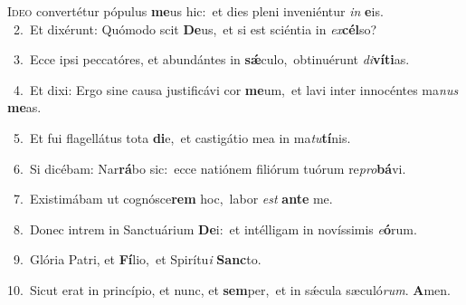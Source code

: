 \lettrine{\initial\textcolor{\initialcolor}{I}}{deo} convertétur pópulus \textbf{me}\-us hic:~\star et dies pleni inveniéntur \textit{in} \textbf{e}\-is.\\
{\numbfont\textcolor{\numbcolor}{~2.}}~Et dixérunt: Quómodo scit \textbf{De}\-us,~\star et si est sciéntia in \textit{ex}\-\textbf{cél}so?\par
{\numbfont\textcolor{\numbcolor}{~3.}}~Ecce ipsi peccatóres, et abundántes in \textbf{sǽ}\-culo,~\star obtinuérunt \textit{di}\-\textbf{ví}\textbf{ti}as.\par
{\numbfont\textcolor{\numbcolor}{~4.}}~Et dixi: Ergo sine causa justificávi cor \textbf{me}\-um,~\star et lavi inter innocéntes ma\textit{nus} \textbf{me}\-as.\par
{\numbfont\textcolor{\numbcolor}{~5.}}~Et fui flagellátus tota \textbf{di}\-e,~\star et castigátio mea in ma\-\textit{tu}\-\textbf{tí}nis.\par
{\numbfont\textcolor{\numbcolor}{~6.}}~Si dicébam: Nar\-\textbf{rá}\-bo sic:~\star ecce natiónem filiórum tuórum re\-\textit{pro}\-\textbf{bá}vi.\par
{\numbfont\textcolor{\numbcolor}{~7.}}~Existimábam ut cognósce\textbf{rem} hoc,~\star labor \textit{est} \textbf{an}\-\textbf{te} me.\par
{\numbfont\textcolor{\numbcolor}{~8.}}~Donec intrem in Sanctuárium \textbf{De}\-i:~\star et intélligam in novíssimis \textit{e}\-\textbf{ó}rum.\par
{\numbfont\textcolor{\numbcolor}{~9.}}~Glória Patri, et \textbf{Fí}\-lio,~\star et Spirítu\textit{i} \textbf{Sanc}\-to.\par
{\numbfont\textcolor{\numbcolor}{10.}}~Sicut erat in princípio, et nunc, et \textbf{sem}\-per,~\star et in sǽcula sæculó\-\textit{rum}\-. \textbf{A}\-men.\par
